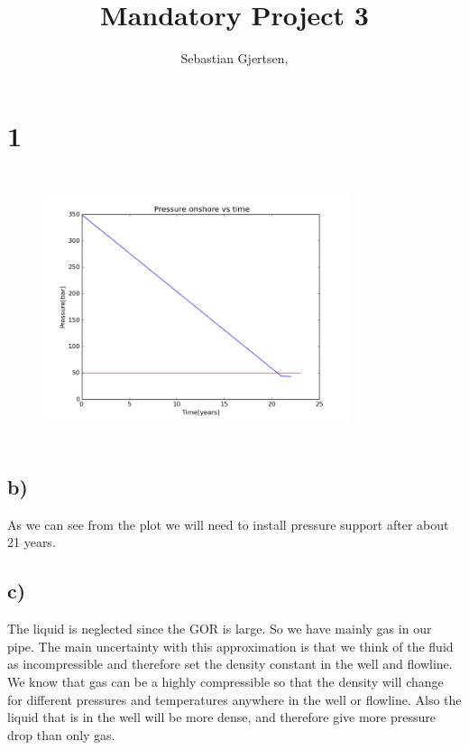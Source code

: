 \documentclass[DIV=calc, paper=a4, fontsize=13pt, twocolumn]{scrartcl}	 %
\title{Mandatory Project 3} %
\author{Sebastian Gjertsen, } %
\date{} %
\begin{document}
\maketitle %

\thispagestyle{fancy} %







\section*{1}
\begin{figure}[h]
\includegraphics[width=9cm,height=8cm]{Pressure_years.png}
\end{figure}
\subsection*{b)}
As we can see from the plot we will need to install pressure support after about 21 years.
\subsection*{c)}
The liquid is neglected since the GOR is large. So we have mainly gas in our pipe. The main uncertainty with this approximation is that we think of the fluid as incompressible and therefore set the density constant in the well and flowline. We know that gas can be a highly compressible so that the density will change for different pressures and temperatures anywhere in the well or flowline.
\newline
Also the liquid that is in the well will be more dense, and therefore give more pressure drop than only gas.
\end{document}
